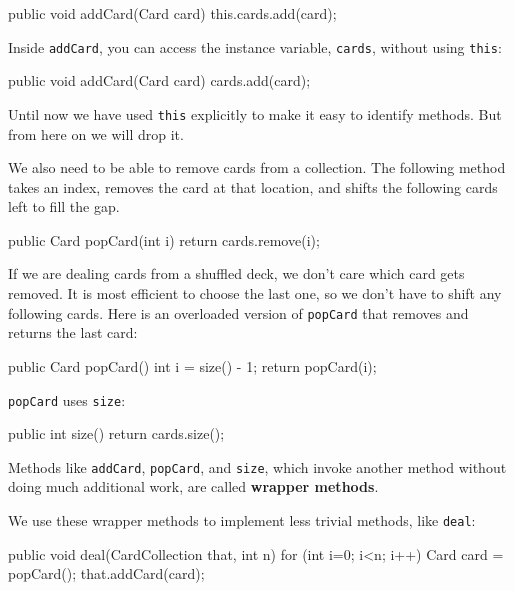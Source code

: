 \documentclass[12pt]{book}
\theoremstyle{exercise}
\newcommand{\java}[1]{\verb"#1"}
\newcommand{\java}[1]{\lstinline{#1}} %
\begin{document}
\begin{code}
    public void addCard(Card card) {
        this.cards.add(card);
    }
\end{code}

Inside \java{addCard}, you can access the instance variable, \java{cards}, without using \java{this}:

\begin{code}
    public void addCard(Card card) {
        cards.add(card);
    }
\end{code}

Until now we have used \java{this} explicitly to make it easy to identify methods.
But from here on we will drop it.

We also need to be able to remove cards from a collection.
The following method takes an index, removes the card at that location, and shifts the following cards left to fill the gap.

\begin{code}
    public Card popCard(int i) {
        return cards.remove(i);
    }
\end{code}

If we are dealing cards from a shuffled deck, we don't care which card gets removed.
It is most efficient to choose the last one, so we don't have to shift any following cards.
Here is an overloaded version of \java{popCard} that removes and returns the last card:

\begin{code}
    public Card popCard() {
        int i = size() - 1;
        return popCard(i);
    }
\end{code}

\java{popCard} uses \java{size}:

\begin{code}
    public int size() {
        return cards.size();
    }
\end{code}

Methods like \java{addCard}, \java{popCard}, and \java{size}, which invoke another method without doing much additional work, are called {\bf wrapper methods}.

We use these wrapper methods to implement less trivial methods, like \java{deal}:

\begin{code}
    public void deal(CardCollection that, int n) {
        for (int i=0; i<n; i++) {
            Card card = popCard();
            that.addCard(card);
        }
    }
\end{code}
\end{document}
